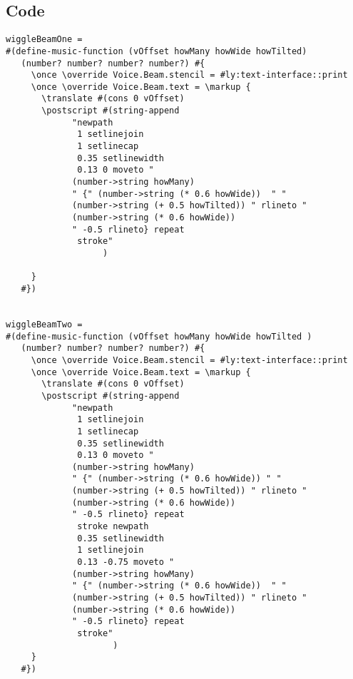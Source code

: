 \subsection{Code}
\begin{verbatim}
wiggleBeamOne =
#(define-music-function (vOffset howMany howWide howTilted)
   (number? number? number? number?) #{
     \once \override Voice.Beam.stencil = #ly:text-interface::print
     \once \override Voice.Beam.text = \markup {
       \translate #(cons 0 vOffset)
       \postscript #(string-append
             "newpath 
              1 setlinejoin 
              1 setlinecap 
              0.35 setlinewidth
              0.13 0 moveto "
             (number->string howMany)
             " {" (number->string (* 0.6 howWide))  " "
             (number->string (+ 0.5 howTilted)) " rlineto "
             (number->string (* 0.6 howWide))
             " -0.5 rlineto} repeat
              stroke"
                   )

     }
   #})


wiggleBeamTwo =
#(define-music-function (vOffset howMany howWide howTilted )
   (number? number? number? number?) #{
     \once \override Voice.Beam.stencil = #ly:text-interface::print
     \once \override Voice.Beam.text = \markup {
       \translate #(cons 0 vOffset)
       \postscript #(string-append
             "newpath 
              1 setlinejoin 
              1 setlinecap 
              0.35 setlinewidth 
              0.13 0 moveto "
             (number->string howMany)
             " {" (number->string (* 0.6 howWide)) " "
             (number->string (+ 0.5 howTilted)) " rlineto "
             (number->string (* 0.6 howWide))
             " -0.5 rlineto} repeat
              stroke newpath 
              0.35 setlinewidth 
              1 setlinejoin 
              0.13 -0.75 moveto "
             (number->string howMany)
             " {" (number->string (* 0.6 howWide))  " "
             (number->string (+ 0.5 howTilted)) " rlineto "
             (number->string (* 0.6 howWide))
             " -0.5 rlineto} repeat
              stroke"
                     )
     }
   #})



\end{verbatim}
